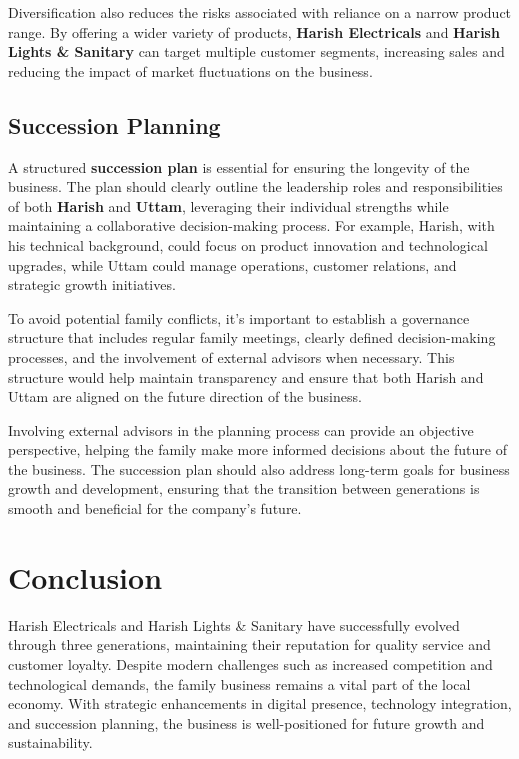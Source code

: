 \documentclass[a4paper,12pt]{report}
\begin{document}
Diversification also reduces the risks associated with reliance on a narrow product range. By offering a wider variety of products, \textbf{Harish Electricals} and \textbf{Harish Lights \& Sanitary} can target multiple customer segments, increasing sales and reducing the impact of market fluctuations on the business.

\section{Succession Planning}
A structured \textbf{succession plan} is essential for ensuring the longevity of the business. The plan should clearly outline the leadership roles and responsibilities of both \textbf{Harish} and \textbf{Uttam}, leveraging their individual strengths while maintaining a collaborative decision-making process. For example, Harish, with his technical background, could focus on product innovation and technological upgrades, while Uttam could manage operations, customer relations, and strategic growth initiatives.

To avoid potential family conflicts, it’s important to establish a governance structure that includes regular family meetings, clearly defined decision-making processes, and the involvement of external advisors when necessary. This structure would help maintain transparency and ensure that both Harish and Uttam are aligned on the future direction of the business.

Involving external advisors in the planning process can provide an objective perspective, helping the family make more informed decisions about the future of the business. The succession plan should also address long-term goals for business growth and development, ensuring that the transition between generations is smooth and beneficial for the company’s future.




\chapter{Conclusion}

Harish Electricals and Harish Lights \& Sanitary have successfully evolved through three generations, maintaining their reputation for quality service and customer loyalty. Despite modern challenges such as increased competition and technological demands, the family business remains a vital part of the local economy. With strategic enhancements in digital presence, technology integration, and succession planning, the business is well-positioned for future growth and sustainability.
\end{document}

